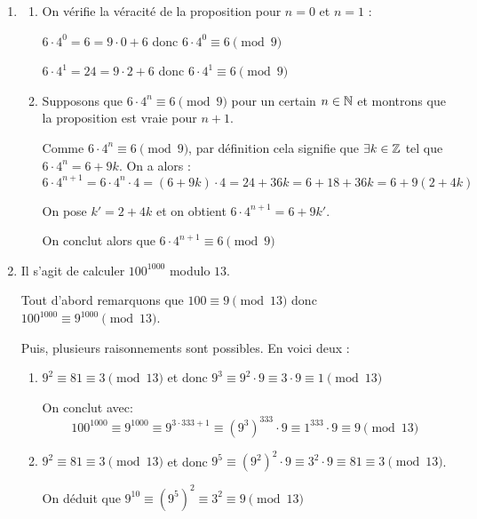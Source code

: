 \begin{enumerate}[label=\thechapter.\arabic*, font=\bfseries, itemsep=7mm,labelsep*=3mm,left=0mm]
\begin{enumerate}[label=\roman*),itemsep=5mm,left=-1mm,labelsep*=2mm]
\end{enumerate}




\item 
\begin{enumerate}[label=\arabic*),itemsep=3mm,left=-1mm,labelsep*=2mm]
	\item On vérifie la véracité de la proposition pour $n=0$ et $n=1$ :
	
	\smallskip
	$6\cdot 4^0=6=9\cdot 0 +6$ donc $6\cdot 4^0\equiv 6 \pmod{9}$
	
	\smallskip
	$6\cdot 4^1=24=9\cdot 2 +6$ donc $6\cdot 4^1\equiv 6 \pmod{9}$
	
	\item Supposons que $6\cdot 4^n\equiv 6 \pmod{9}$ pour un certain $n\in \mathbb{N}$ et montrons que la proposition est vraie pour $n+1$.
	
	\smallskip
	Comme $6\cdot 4^n\equiv 6 \pmod{9}$, par définition cela signifie que $\exists k\in \mathbb{Z}$ tel que $6\cdot 4^n=6+9k$. On a alors :
	$$6\cdot 4^{n+1}=6\cdot 4^n\cdot 4=(6+9k)\cdot 4=24+36k=6+18+36k=6+9(2+4k)$$
	
	On pose $k'=2+4k$ et on obtient $6\cdot 4^{n+1}=6+9k'$.
	
	\smallskip
	On conclut alors que $6\cdot 4^{n+1} \equiv 6 \pmod{9}$
\end{enumerate}
\clearpage



\item
Il s'agit de calculer $100^{1000}$ modulo $13$. 

\smallskip
Tout d'abord remarquons que $100 \equiv 9 \pmod{13}$ donc  $100^{1000} \equiv 9^{1000} \pmod{13}$. 

\smallskip
Puis, plusieurs raisonnements sont possibles. En voici deux :

\begin{enumerate}[label=\roman*)]
	\item $9^{2} \equiv 81 \equiv 3 \pmod{13}$ et donc $9^{3} \equiv 9^2\cdot 9 \equiv 3\cdot 9 \equiv 1 \pmod{13}$
	
	On conclut avec: $$100^{1000} \equiv 9^{1000} \equiv 9^{3\cdot 333+1} \equiv \left(9^3\right)^{333}\cdot9  \equiv 1^{333}\cdot9 \equiv 9 \pmod{13}$$
	
	\item $9^{2} \equiv 81 \equiv 3 \pmod{13}$ et donc $9^{5} \equiv \left(9^2\right)^2\cdot 9 \equiv 3^2\cdot 9 \equiv 81 \equiv 3 \pmod{13}$.
	
	On déduit que $9^{10} \equiv \left(9^5\right)^2 \equiv 3^2 \equiv  9 \pmod{13}$
	

\end{enumerate}
\end{enumerate}
